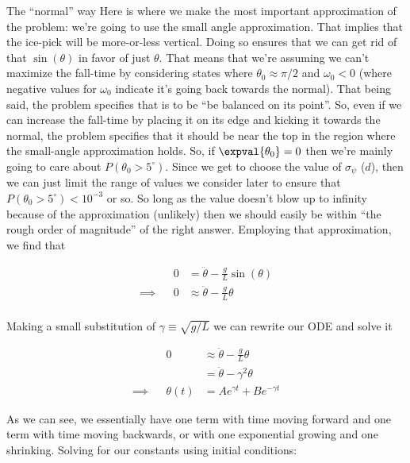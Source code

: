 \begin{answer}
\begin{answerpart}{The ``normal'' way}
    Here is where we make the most important approximation of the
    problem: we're going to use the small angle approximation.  That
    implies that the ice-pick will be more-or-less vertical.  Doing so
    ensures that we can get rid of that $\sin(\theta)$ in favor of
    just $\theta$.  That means that we're assuming we can't maximize
    the fall-time by considering states where $\theta_0 \approx \pi/2$
    and $\omega_0 < 0$ (where negative values for $\omega_0$ indicate
    it's going back towards the normal).  That being said, the problem
    specifies that \icepick{} is to be ``be balanced on its point''.
    So, even if we can increase the fall-time by placing it on its
    edge and kicking it towards the normal, the problem specifies that
    it should be near the top in the region where the small-angle
    approximation holds.  So, if $\expval{\theta_0} = 0$ then we're
    mainly going to care about $P(\theta_0 > 5^\circ)$.  Since we get
    to choose the value of $\sigma_\psi$ ($d$), then we can just limit
    the range of values we consider later to ensure that $P(\theta_0 >
    5^\circ) < 10^{-3}$ or so.  So long as the value doesn't blow up
    to infinity because of the approximation (unlikely) then we should
    easily be within ``the rough order of magnitude'' of the right
    answer.  Employing that approximation, we find that

    \begin{equation}
      \begin{alignedat}{2}
        && 0 &= \ddot{\theta} - \frac{g}{L}\sin(\theta)\\
        \implies{}&& 0 &\approx \ddot{\theta} - \frac{g}{L}\theta\\
      \end{alignedat}
    \end{equation}

    Making a small substitution of $\gamma \equiv \sqrt{g/L}$ we can
    rewrite our ODE and solve it

    \begin{equation}
      \begin{alignedat}{2}
        && 0 &\approx \ddot{\theta} - \frac{g}{L}\theta\\
        &&&= \ddot{\theta} - \gamma^2\theta\\
        \implies{}&& \theta(t) &= A e^{\gamma t} + B e^{-\gamma t}
      \end{alignedat}
    \end{equation}

    As we can see, we essentially have one term with time moving
    forward and one term with time moving backwards, or with one
    exponential growing and one shrinking.  Solving for our constants
    using initial conditions:


\end{answerpart}
\end{answer}

